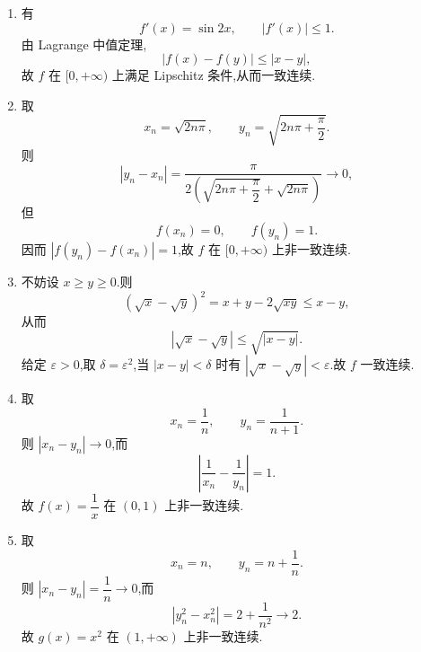 \begin{solution}
    \leavevmode
    \begin{enumerate}
        \item 有
              \[
                  f'(x)=\sin2x,\qquad |f'(x)|\leq1.
              \]
              由 Lagrange 中值定理,
              \[
                  |f(x)-f(y)|\leq|x-y|,
              \]
              故 $f$ 在 $\lbrack0,+\infty)$ 上满足 Lipschitz 条件,从而一致连续.

        \item 取
              \[
                  x_n=\sqrt{2n\pi},
                  \qquad
                  y_n=\sqrt{2n\pi+\dfrac{\pi}{2}}.
              \]
              则
              \[
                  |y_n-x_n|
                  =\dfrac{\pi}
                  {2\left(\sqrt{2n\pi+\dfrac{\pi}{2}}+\sqrt{2n\pi}\right)}
                  \longrightarrow0,
              \]
              但
              \[
                  f(x_n)=0,\qquad f(y_n)=1.
              \]
              因而 $|f(y_n)-f(x_n)|=1$,故 $f$ 在 $\lbrack0,+\infty)$ 上非一致连续.

        \item 不妨设 $x\geq y\geq0$.则
              \[
                  (\sqrt{x}-\sqrt{y})^2
                  =x+y-2\sqrt{xy}
                  \leq x-y,
              \]
              从而
              \[
                  |\sqrt{x}-\sqrt{y}|
                  \leq\sqrt{|x-y|}.
              \]
              给定 $\varepsilon>0$,取 $\delta=\varepsilon^2$,当 $|x-y|<\delta$ 时有 $|\sqrt{x}-\sqrt{y}|<\varepsilon$.故 $f$ 一致连续.

        \item 取
              \[
                  x_n=\dfrac{1}{n},
                  \qquad
                  y_n=\dfrac{1}{n+1}.
              \]
              则 $|x_n-y_n|\to0$,而
              \[
                  \left|\dfrac{1}{x_n}-\dfrac{1}{y_n}\right|=1.
              \]
              故 $f(x)=\dfrac{1}{x}$ 在 $(0,1)$ 上非一致连续.

        \item 取
              \[
                  x_n=n,
                  \qquad
                  y_n=n+\dfrac{1}{n}.
              \]
              则 $|x_n-y_n|=\dfrac{1}{n}\to0$,而
              \[
                  |y_n^2-x_n^2|
                  =2+\dfrac{1}{n^2}\longrightarrow2.
              \]
              故 $g(x)=x^2$ 在 $(1,+\infty)$ 上非一致连续.
    \end{enumerate}
\end{solution}

